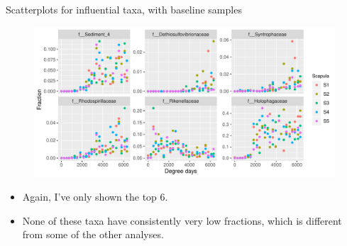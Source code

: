 \documentclass{beamer}
\begin{document}
\begin{frame}{Scatterplots for influential taxa, with baseline samples}

  \begin{center}
    \begin{figure}
      \includegraphics[width=4.75in]{RiceRivers/bacteria/use_families/w_scapulae/w_baseline/infl_scapula_family_w_baseline_scatter}
    \end{figure}
  \end{center}
  \vspace{-0.25in}
  {\scriptsize
  \begin{itemize}
  \item Again, I've only shown the top 6.
  \item None of these taxa have consistently very low fractions, which is different from some of the other analyses.
  \end{itemize}
  }

\end{frame}
\end{document}
